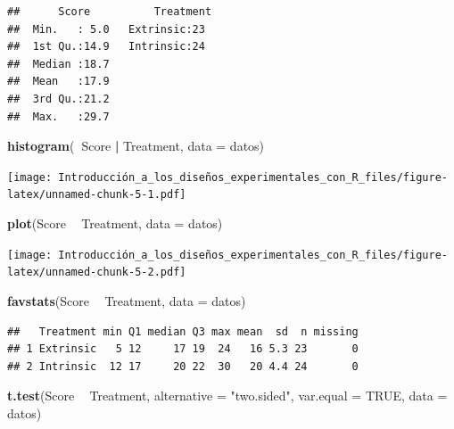 \documentclass[]{book}
\newenvironment{Shaded}{\begin{snugshade}}{\end{snugshade}}
\newcommand{\KeywordTok}[1]{\textcolor[rgb]{0.13,0.29,0.53}{\textbf{#1}}}
\newcommand{\DataTypeTok}[1]{\textcolor[rgb]{0.13,0.29,0.53}{#1}}
\newcommand{\StringTok}[1]{\textcolor[rgb]{0.31,0.60,0.02}{#1}}
\newcommand{\OtherTok}[1]{\textcolor[rgb]{0.56,0.35,0.01}{#1}}
\newcommand{\OperatorTok}[1]{\textcolor[rgb]{0.81,0.36,0.00}{\textbf{#1}}}
\newcommand{\NormalTok}[1]{#1}
\begin{document}
\begin{verbatim}
##      Score          Treatment 
##  Min.   : 5.0   Extrinsic:23  
##  1st Qu.:14.9   Intrinsic:24  
##  Median :18.7                 
##  Mean   :17.9                 
##  3rd Qu.:21.2                 
##  Max.   :29.7
\end{verbatim}

\begin{Shaded}
\begin{Highlighting}[]
\KeywordTok{histogram}\NormalTok{(}\OperatorTok{~}\NormalTok{Score }\OperatorTok{|}\StringTok{ }\NormalTok{Treatment, }\DataTypeTok{data =}\NormalTok{ datos)}
\end{Highlighting}
\end{Shaded}

\texttt{[image: Introducción\_a\_los\_diseños\_experimentales\_con\_R\_files/figure-latex/unnamed-chunk-5-1.pdf]}

\begin{Shaded}
\begin{Highlighting}[]
\KeywordTok{plot}\NormalTok{(Score }\OperatorTok{~}\StringTok{ }\NormalTok{Treatment, }\DataTypeTok{data =}\NormalTok{ datos)}
\end{Highlighting}
\end{Shaded}

\texttt{[image: Introducción\_a\_los\_diseños\_experimentales\_con\_R\_files/figure-latex/unnamed-chunk-5-2.pdf]}

\begin{Shaded}
\begin{Highlighting}[]
\KeywordTok{favstats}\NormalTok{(Score }\OperatorTok{~}\StringTok{ }\NormalTok{Treatment, }\DataTypeTok{data =}\NormalTok{ datos)}
\end{Highlighting}
\end{Shaded}

\begin{verbatim}
##   Treatment min Q1 median Q3 max mean  sd  n missing
## 1 Extrinsic   5 12     17 19  24   16 5.3 23       0
## 2 Intrinsic  12 17     20 22  30   20 4.4 24       0
\end{verbatim}

\begin{Shaded}
\begin{Highlighting}[]
\KeywordTok{t.test}\NormalTok{(Score }\OperatorTok{~}\StringTok{ }\NormalTok{Treatment, }\DataTypeTok{alternative =} \StringTok{"two.sided"}\NormalTok{, }\DataTypeTok{var.equal =} \OtherTok{TRUE}\NormalTok{, }\DataTypeTok{data =}\NormalTok{ datos)}
\end{Highlighting}
\end{Shaded}
\end{document}
